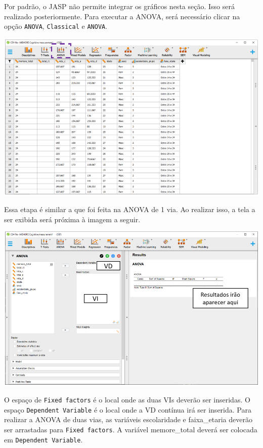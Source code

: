 \documentclass[
]{book}
\begin{document}
Por padrão, o JASP não permite integrar os gráficos nesta seção. Isso
será realizado posteriormente. Para executar a ANOVA, será necessário
clicar na opção \texttt{ANOVA}, \texttt{Classical} e \texttt{ANOVA}.

\includegraphics{./img/cap_anova_interface3.png}

Essa etapa é similar a que foi feita na ANOVA de 1 via. Ao realizar
isso, a tela a ser exibida será próxima à imagem a seguir.

\includegraphics{./img/cap_anova_two_way_interface.png}

O espaço de \texttt{Fixed\ factors} é o local onde as duas VIs deverão
ser inseridas. O espaço \texttt{Dependent\ Variable} é o local onde a VD
contínua irá ser inserida. Para realizar a ANOVA de duas vias, as
variáveis escolaridade e faixa\_etaria deverão ser arrastadas para
\texttt{Fixed\ factors}. A variável memore\_total deverá ser colocada em
\texttt{Dependent\ Variable}.
\end{document}
